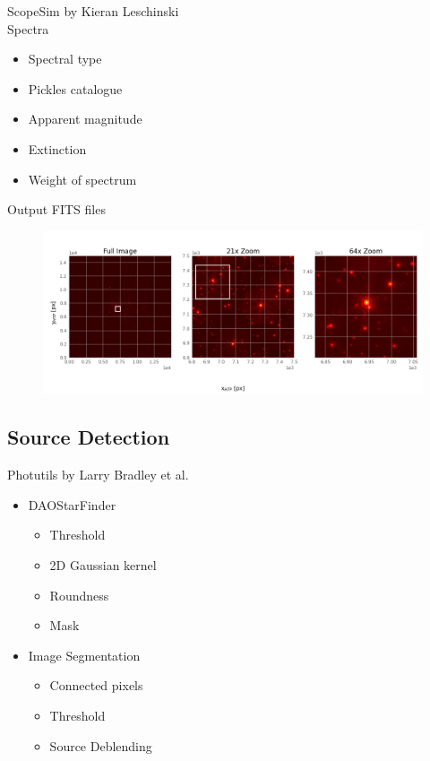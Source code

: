 \documentclass{beamer}
\begin{document}
\begin{frame}

ScopeSim by Kieran Leschinski
\\[2ex]
Spectra
\begin{itemize}
\item Spectral type
\item Pickles catalogue
\item Apparent magnitude
\item Extinction
\item Weight of spectrum
\end{itemize}
\vspace{\baselineskip}
Output FITS files
\end{frame}

\begin{frame}
\begin{figure}
\centering
\includegraphics[width=\textwidth]{Images/fits_snapshot.png}
\end{figure}
\end{frame}

\subsection{Source Detection}

\begin{frame}
Photutils by Larry Bradley et al.
\\[2ex]
\begin{itemize}
\item DAOStarFinder
	\begin{itemize}
	\item Threshold
	\item 2D Gaussian kernel
	\item Roundness
	\item Mask
	\end{itemize}

\item Image Segmentation
	\begin{itemize}
	\item Connected pixels 
	\item Threshold
	\item Source Deblending
	\end{itemize}
\end{itemize}

\end{frame}
\end{document}
